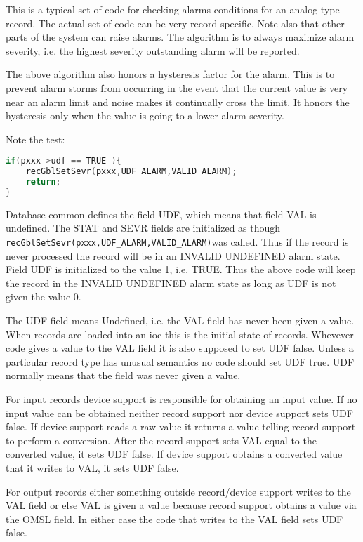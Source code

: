 This is a typical set of code for checking alarms conditions for an analog type record.
The actual set of code can be very record specific.
Note also that other parts of the system can raise alarms.
The algorithm is to always maximize alarm severity, i.e. the highest severity outstanding alarm will be reported.

The above algorithm also honors a hysteresis factor for the alarm.
This is to prevent alarm storms from occurring in the event that the current value is very near an alarm limit and noise makes it continually cross the limit.
It honors the hysteresis only when the value is going to a lower alarm severity.

Note the test:

\begin{lstlisting}[language=C]
if(pxxx->udf == TRUE ){
    recGblSetSevr(pxxx,UDF_ALARM,VALID_ALARM);
    return;
}
\end{lstlisting}

Database common defines the field UDF, which means that field VAL is undefined.
The STAT and SEVR fields are initialized as though \verb|recGblSetSevr(pxxx,UDF_ALARM,VALID_ALARM)|was called.
Thus if the record is never processed the record will be in an INVALID UNDEFINED alarm state.
Field UDF is initialized to the value 1, i.e. TRUE.
Thus the above code will keep the record in the INVALID UNDEFINED alarm state as long as UDF is not given the value 0.

The UDF field means Undefined, i.e. the VAL field has never been given a value.
When records are loaded into an ioc this is the initial state of records.
Whevever code gives a value to the VAL field it is also supposed to set UDF false.
Unless a particular record type has unusual semantics no code should set UDF true.
UDF normally means that the field was never given a value.

For input records device support is responsible for obtaining an input value.
If no input value can be obtained neither record support nor device support sets UDF false.
If device support reads a raw value it returns a value telling record support to perform a conversion.
After the record support sets VAL equal to the converted value, it sets UDF false.
If device support obtains a converted value that it writes to VAL, it sets UDF false.

For output records either something outside record/device support writes to the VAL field or else VAL is given a value because record support obtains a value via the OMSL field.
In either case the code that writes to the VAL field sets UDF false.

